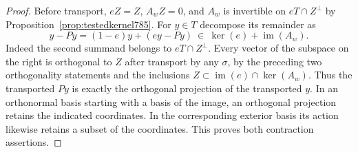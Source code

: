 \documentclass[a4paper,11pt]{article}
\theoremstyle{definition}
\theoremstyle{remark}
\numberwithin{equation}{section}
\begin{document}
\begin{proof}
Before transport, \(eZ=Z\), \(A_wZ=0\), and \(A_w\) is invertible
on \(eT\cap Z^\perp\) by Proposition~\ref{prop:testedkernel785}.
For \(y\in T\) decompose its remainder as
\[
       y-Py=(1-e)y+(ey-Py)
                       \ \in\ \ker(e)+\operatorname{im}(A_w).
\]
Indeed the second summand belongs to \(eT\cap Z^\perp\). Every
vector of the subspace on the right is orthogonal to \(Z\)
after transport by any \(\sigma\), by the preceding two
orthogonality statements and the inclusions
\(Z\subset\operatorname{im}(e)\cap\ker(A_w)\).
Thus the transported \(Py\) is exactly the orthogonal
projection of the transported \(y\). In an orthonormal basis
starting with a basis of the image, an orthogonal projection
retains the indicated coordinates. In the corresponding
exterior basis its action likewise retains a subset of the
coordinates. This proves both contraction assertions.
\end{proof}
\end{document}

